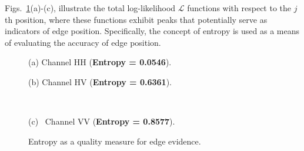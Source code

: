 \documentclass{article}
\begin{document}
Figs.~\ref{fig:entropy1}(a)-(c), illustrate the total log-likelihood $\mathcal L$ functions with respect to the $j$th position, where these functions exhibit peaks that potentially serve as indicators of edge position. Specifically, the concept of entropy is used as a means of evaluating the accuracy of edge position.

\begin{figure}[hbt]
    \begin{minipage}{0.5\textwidth}
       \begin{minipage}[b]{.5\linewidth}
  \centering
 \centerline{}
  \vspace{-0.1cm}
  \centerline{\footnotesize{ (a) Channel HH (\textbf{Entropy = 0.0546}).}}\medskip
\end{minipage}%
\begin{minipage}[b]{.5\linewidth}
  \centering
\centerline{}
  \vspace{-0.2cm}
  \centerline{\footnotesize{(b) Channel HV (\textbf{Entropy =  0.6361}).}}\medskip
\end{minipage}\\
\hfill 
\vspace{-0.3cm}
 \centering
\begin{minipage}[b]{0.5\linewidth}
  \centering
 \centerline{}
  \vspace{-0.1cm}
  \centerline{\footnotesize{(c) \, Channel VV  (\textbf{Entropy =  0.8577}).}}\medskip
\end{minipage}\vspace{-0.2cm}
       \caption{Entropy as a quality measure for edge evidence.} 
\label{fig:entropy1}
    \end{minipage}%
\end{figure}
\end{document}
